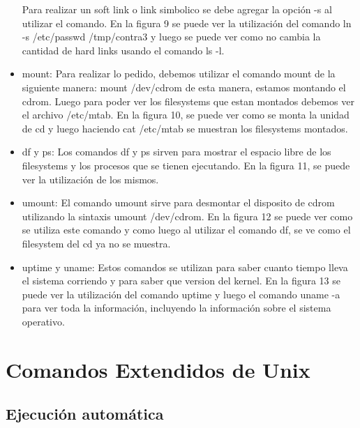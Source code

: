 \documentclass[a4paper, 12pt]{article}
\begin{document}
\begin{itemize}
Para realizar un soft link o link simbolico se debe agregar la opci\'on -s al utilizar el comando. En la figura 9 se puede ver la utilizaci\'on del comando ln -s /etc/passwd /tmp/contra3 y luego se puede ver como no cambia la cantidad de hard links usando el comando ls -l.

\item mount: Para realizar lo pedido, debemos utilizar el comando mount de la siguiente manera: mount /dev/cdrom de esta manera, estamos montando el cdrom. Luego para poder ver los filesystems que estan montados debemos ver el archivo /etc/mtab. En la figura 10, se puede ver como se monta la unidad de cd y luego haciendo cat /etc/mtab se muestran los filesystems montados.

\item df y ps: Los comandos df y ps sirven para mostrar el espacio libre de los filesystems y los procesos que se tienen ejecutando. En la figura 11, se puede ver la utilizaci\'on de los mismos.

\item umount: El comando umount sirve para desmontar el disposito de cdrom utilizando la sintaxis umount /dev/cdrom. En la figura 12 se puede ver como se utiliza este comando y como luego al utilizar el comando df, se ve como el filesystem del cd ya no se muestra.

\item uptime y uname: Estos comandos se utilizan para saber cuanto tiempo lleva el sistema corriendo y para saber que version del kernel. En la figura 13 se puede ver la utilizaci\'on del comando uptime y luego el comando uname -a para ver toda la informaci\'on, incluyendo la informaci\'on sobre el sistema operativo.

\end{itemize}

\section*{Comandos Extendidos de Unix}

\subsection*{Ejecuci\'on autom\'atica}
\end{document}
